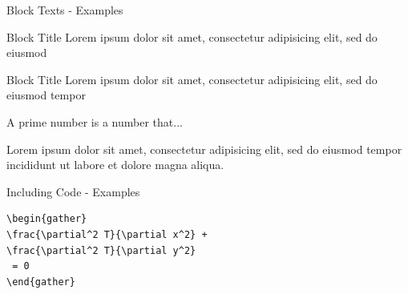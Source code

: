 \documentclass[english,landscape,xcolor=dvipsnames,aspectratio=169]{beamer}
\begin{document}
\begin{frame}{Block Texts  - Examples}

\begin{block}{Block Title}
Lorem ipsum dolor sit amet, consectetur adipisicing elit, 
sed do eiusmod 
\end{block}

\begin{alertblock}{Block Title}
Lorem ipsum dolor sit amet, consectetur adipisicing elit, 
sed do eiusmod tempor
\end{alertblock}

\begin{definition}
A prime number is a number that...
\end{definition}

\begin{example}
Lorem ipsum dolor sit amet, consectetur adipisicing elit, 
sed do eiusmod tempor incididunt ut labore et
dolore magna aliqua.
\end{example}
    
\end{frame}








\begin{frame}[fragile]{Including Code  - Examples}
\begin{lstlisting}
\begin{gather}
\frac{\partial^2 T}{\partial x^2} + 
\frac{\partial^2 T}{\partial y^2} 
 = 0
\end{gather}
\end{lstlisting}
\end{frame}









%
%		
\end{document}
